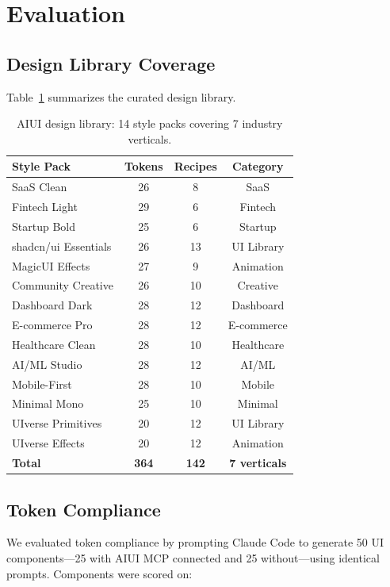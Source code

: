\documentclass[11pt,twocolumn]{article}
\begin{document}
\section{Evaluation}

\subsection{Design Library Coverage}
Table~\ref{tab:packs} summarizes the curated design library.

\begin{table}[h]
\centering
\small
\begin{tabular}{@{}lccc@{}}
\toprule
\textbf{Style Pack} & \textbf{Tokens} & \textbf{Recipes} & \textbf{Category} \\
\midrule
SaaS Clean & 26 & 8 & SaaS \\
Fintech Light & 29 & 6 & Fintech \\
Startup Bold & 25 & 6 & Startup \\
shadcn/ui Essentials & 26 & 13 & UI Library \\
MagicUI Effects & 27 & 9 & Animation \\
Community Creative & 26 & 10 & Creative \\
Dashboard Dark & 28 & 12 & Dashboard \\
E-commerce Pro & 28 & 12 & E-commerce \\
Healthcare Clean & 28 & 10 & Healthcare \\
AI/ML Studio & 28 & 12 & AI/ML \\
Mobile-First & 28 & 10 & Mobile \\
Minimal Mono & 25 & 10 & Minimal \\
UIverse Primitives & 20 & 12 & UI Library \\
UIverse Effects & 20 & 12 & Animation \\
\midrule
\textbf{Total} & \textbf{364} & \textbf{142} & \textbf{7 verticals} \\
\bottomrule
\end{tabular}
\caption{AIUI design library: 14 style packs covering 7 industry verticals.}
\label{tab:packs}
\end{table}

\subsection{Token Compliance}
We evaluated token compliance by prompting Claude Code to generate 50 UI components---25 with AIUI MCP connected and 25 without---using identical prompts. Components were scored on:
\end{document}
